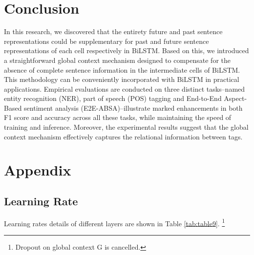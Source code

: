 \documentclass[lettersize,journal]{IEEEtran}
\begin{document}
\section{Conclusion}
In this research, we discovered that the entirety future and past sentence representations could be supplementary for past and future sentence representations of each cell respectively in BiLSTM. Based on this, we introduced a straightforward global context mechanism designed to compensate for the absence of complete sentence information in the intermediate cells of BiLSTM. This methodology can be conveniently incorporated with BiLSTM in practical applications. Empirical evaluations are conducted on three distinct tasks–named entity recognition (NER), part of speech (POS) tagging and End-to-End Aspect-Based sentiment analysis (E2E-ABSA)–illustrate marked enhancements in both F1 score and accuracy across all these tasks, while maintaining the speed of training and inference. Moreover, the experimental results suggest that the global context mechanism effectively captures the relational information between tags. 





\newpage

\section{Appendix}

\subsection{Learning Rate} 
Learning rates details of different layers are shown in Table \ref{tab:table9}.
\footnote{Dropout on global context G is cancelled.} 
\begin{table}[h]
\centering
{}
\caption{Learning rates of different layers on tasks. \label{tab:table9}}
\end{table}
\end{document}
